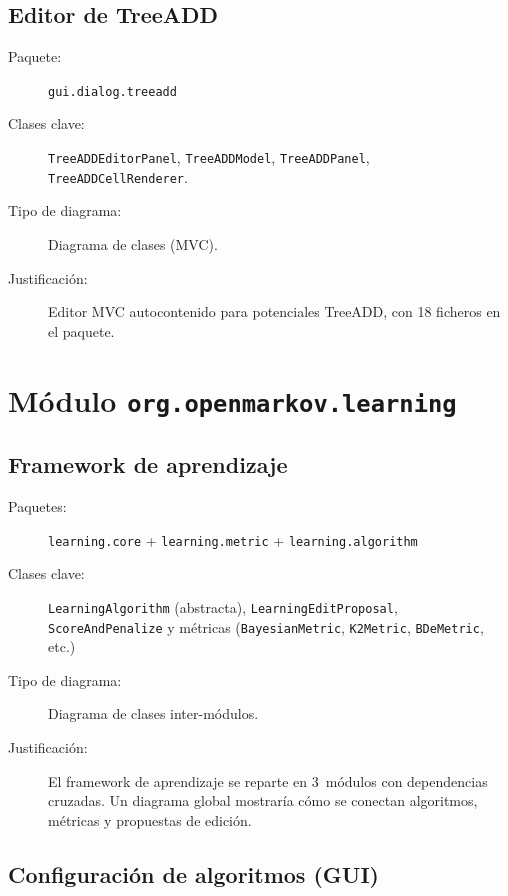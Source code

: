 \documentclass[11pt,a4paper]{article}
\newcommand{\code}[1]{\texttt{#1}}
\newcommand{\pkg}[1]{\texttt{\small #1}}
\begin{document}
\subsection{Editor de TreeADD}

\begin{description}
  \item[Paquete:] \pkg{gui.dialog.treeadd}
  \item[Clases clave:] \code{TreeADDEditorPanel},
        \code{TreeADDModel}, \code{TreeADDPanel},
        \code{TreeADDCellRenderer}.
  \item[Tipo de diagrama:] Diagrama de clases (MVC).
  \item[Justificaci\'on:] Editor MVC autocontenido para potenciales
        TreeADD, con 18 ficheros en el paquete.
\end{description}

\section{M\'odulo \code{org.openmarkov.learning}}

\subsection{Framework de aprendizaje}

\begin{description}
  \item[Paquetes:] \pkg{learning.core} + \pkg{learning.metric} +
        \pkg{learning.algorithm}
  \item[Clases clave:] \code{LearningAlgorithm} (abstracta),
        \code{LearningEditProposal}, \code{ScoreAndPenalize} y
        m\'etricas (\code{BayesianMetric}, \code{K2Metric},
        \code{BDeMetric}, etc.)
  \item[Tipo de diagrama:] Diagrama de clases inter-m\'odulos.
  \item[Justificaci\'on:] El framework de aprendizaje se reparte en
        3~m\'odulos con dependencias cruzadas.  Un diagrama global
        mostrar\'ia c\'omo se conectan algoritmos, m\'etricas y
        propuestas de edici\'on.
\end{description}

\subsection{Configuraci\'on de algoritmos (GUI)}
\end{document}
